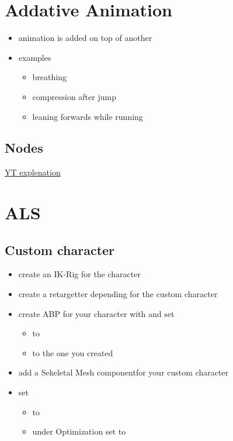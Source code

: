     \section{Addative Animation}
        \begin{itemize}
            \item animation is added on top of another
            \item examples
            \begin{itemize}
                \item breathing
                \item compression after jump
                \item leaning forwards while running
            \end{itemize}
        \end{itemize}
        
        \subsection{Nodes}

        
        \href{https://www.youtube.com/watch?v=flHL3qJB3_I}{YT explenation}


    \section{ALS}
        \subsection{Custom character}
            \begin{itemize}
                \item create an IK-Rig for the character
                \item create a retargetter depending for the custom character
                \item create ABP for your character with  and set
                \begin{itemize}
                    \item {} to 
                    \item {} to the one you created
                \end{itemize}
                \item add a \glqq Sekeletal Mesh component\grqq for your custom character
                \item set
                \begin{itemize}
                    \item {} to 
                    \item under Optimization set  to 
                \end{itemize}
                
            \end{itemize}



